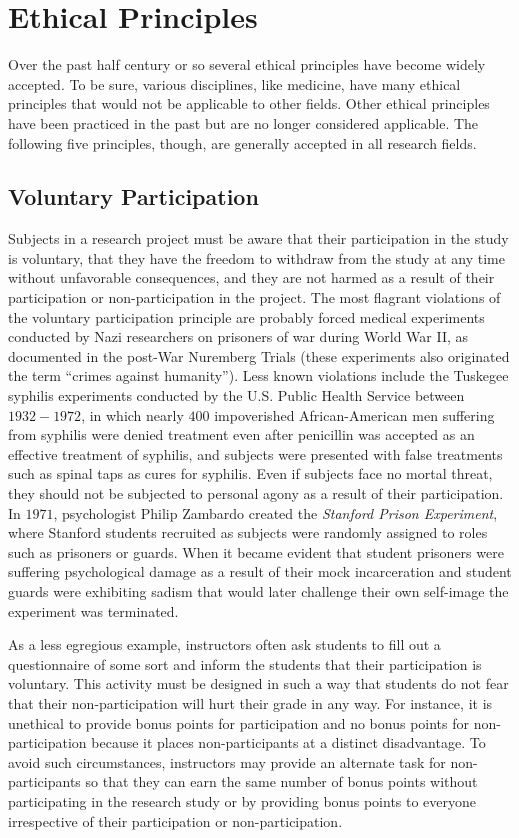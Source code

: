 \section{Ethical Principles}

Over the past half century or so several ethical principles have become widely accepted. To be sure, various disciplines, like medicine, have many ethical principles that would not be applicable to other fields. Other ethical principles have been practiced in the past but are no longer considered applicable. The following five principles, though, are generally accepted in all research fields.

\subsection{Voluntary Participation}

Subjects in a research project must be aware that their participation in the study is voluntary, that they have the freedom to withdraw from the study at any time without unfavorable consequences, and they are not harmed as a result of their participation or non-participation in the project. The most flagrant violations of the voluntary participation principle are probably forced medical experiments conducted by Nazi researchers on prisoners of war during World War II, as documented in the post-War Nuremberg Trials (these experiments also originated the term ``crimes against humanity''). Less known violations include the Tuskegee syphilis experiments\cite{reverby2009examining} conducted by the U.S. Public Health Service between $ 1932-1972 $, in which nearly $ 400 $ impoverished African-American men suffering from syphilis were denied treatment even after penicillin was accepted as an effective treatment of syphilis, and subjects were presented with false treatments such as spinal taps as cures for syphilis. Even if subjects face no mortal threat, they should not be subjected to personal agony as a result of their participation. In $ 1971 $, psychologist Philip Zambardo created the \textit{Stanford Prison Experiment}, where Stanford students recruited as subjects were randomly assigned to roles such as prisoners or guards. When it became evident that student prisoners were suffering psychological damage as a result of their mock incarceration and student guards were exhibiting sadism that would later challenge their own self-image the experiment was terminated.

As a less egregious example, instructors often ask students to fill out a questionnaire of some sort and inform the students that their participation is voluntary. This activity must be designed in such a way that students do not fear that their non-participation will hurt their grade in any way. For instance, it is unethical to provide bonus points for participation and no bonus points for non-participation because it places non-participants at a distinct disadvantage. To avoid such circumstances, instructors may provide an alternate task for non-participants so that they can earn the same number of bonus points without participating in the research study or by providing bonus points to everyone irrespective of their participation or non-participation. 

